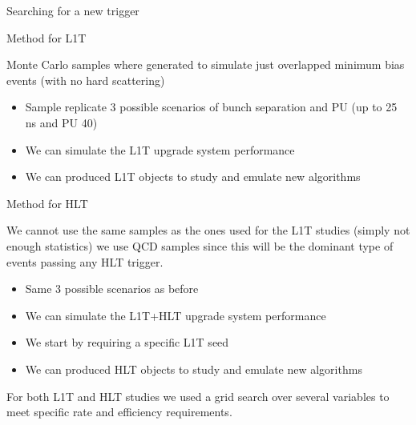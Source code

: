 \documentclass[8pt]{beamer}
\begin{document}
\begin{frame}{Searching for a new trigger}
 
\begin{block}{Method for L1T}

Monte Carlo samples where generated to simulate just overlapped minimum bias events (with no hard scattering)

\begin{itemize}
  \item Sample replicate 3 possible scenarios of bunch separation and PU (up to 25 ns and PU 40) 
  \item We can simulate the L1T upgrade system performance
  \item We can produced L1T objects to study and emulate new algorithms
\end{itemize}
 
\end{block}

\begin{block}{Method for HLT}

We cannot use the same samples as the ones used for the L1T studies (simply not enough statistics) we use
QCD samples since this will be the dominant type of events passing any HLT trigger. 

\begin{itemize}
  \item Same 3 possible scenarios as before
  \item We can simulate the L1T+HLT upgrade system performance
  \item We start by requiring a specific L1T seed
  \item We can produced HLT objects to study and emulate new algorithms
\end{itemize}

\end{block}

For both L1T and HLT studies we used a grid search over several variables to meet specific rate and
efficiency requirements.

\end{frame}
\end{document}
